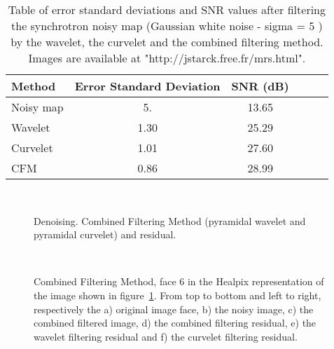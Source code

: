 {\small
\begin{table*}[htb]
\baselineskip=0.4cm
\begin{center}
\begin{tabular}{lccccc} \hline \hline
Method                          &  Error Standard Deviation     &  SNR (dB)    \\ \hline \hline
Noisy map                       & 5.  &      13.65  \\
Wavelet                         & 1.30  &    25.29  \\
Curvelet                        & 1.01  &    27.60  \\
CFM                             & 0.86  &    28.99  \\ \hline
\hline
\end{tabular}
\caption{Table of error standard deviations and SNR values after filtering the synchrotron noisy map (Gaussian white noise - sigma = 5 ) 
by the wavelet, the curvelet and the combined filtering method. Images are available at "http://jstarck.free.fr/mrs.html".}
\label{comptab_sync}
\end{center}
\end{table*}
}

\begin{figure}
\centerline{
\hbox{
}}
\caption{Denoising. Combined Filtering Method (pyramidal wavelet and pyramidal curvelet) and residual.}
\label{Figure:sync_cbf_filter}
\end{figure}


\begin{figure}
\centerline{
\hbox{
}}
\caption{{ Combined Filtering Method, face 6 in the Healpix representation of the image shown in figure~\ref{Figure:sync_cbf_filter}. 
From top to bottom and left to right, respectively the a) original image face, b) the noisy image, c) the combined filtered image, 
d) the combined filtering residual, e) the wavelet filtering residual and f) the curvelet filtering residual.}}
\label{Figure:sync_face_cbf_filter}
\end{figure}

